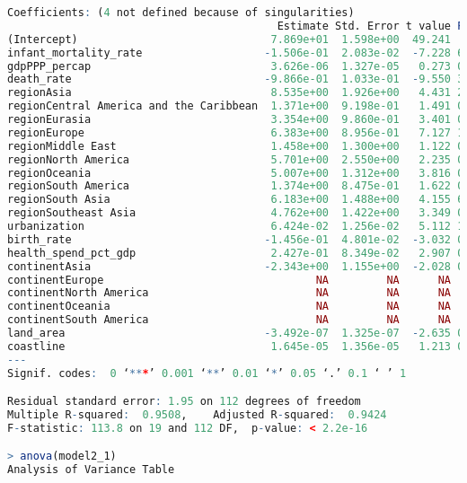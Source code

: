 \begin{lstlisting}[language=R, caption=Result of the model]
Coefficients: (4 not defined because of singularities)
                                          Estimate Std. Error t value Pr(>|t|)    
(Intercept)                              7.869e+01  1.598e+00  49.241  < 2e-16 ***
infant_mortality_rate                   -1.506e-01  2.083e-02  -7.228 6.40e-11 ***
gdpPPP_percap                            3.626e-06  1.327e-05   0.273 0.785155    
death_rate                              -9.866e-01  1.033e-01  -9.550 3.62e-16 ***
regionAsia                               8.535e+00  1.926e+00   4.431 2.19e-05 ***
regionCentral America and the Caribbean  1.371e+00  9.198e-01   1.491 0.138788    
regionEurasia                            3.354e+00  9.860e-01   3.401 0.000930 ***
regionEurope                             6.383e+00  8.956e-01   7.127 1.06e-10 ***
regionMiddle East                        1.458e+00  1.300e+00   1.122 0.264402    
regionNorth America                      5.701e+00  2.550e+00   2.235 0.027378 *  
regionOceania                            5.007e+00  1.312e+00   3.816 0.000223 ***
regionSouth America                      1.374e+00  8.475e-01   1.622 0.107662    
regionSouth Asia                         6.183e+00  1.488e+00   4.155 6.39e-05 ***
regionSoutheast Asia                     4.762e+00  1.422e+00   3.349 0.001105 ** 
urbanization                             6.424e-02  1.256e-02   5.112 1.32e-06 ***
birth_rate                              -1.456e-01  4.801e-02  -3.032 0.003018 ** 
health_spend_pct_gdp                     2.427e-01  8.349e-02   2.907 0.004403 ** 
continentAsia                           -2.343e+00  1.155e+00  -2.028 0.044965 *  
continentEurope                                 NA         NA      NA       NA    
continentNorth America                          NA         NA      NA       NA    
continentOceania                                NA         NA      NA       NA    
continentSouth America                          NA         NA      NA       NA    
land_area                               -3.492e-07  1.325e-07  -2.635 0.009606 ** 
coastline                                1.645e-05  1.356e-05   1.213 0.227708    
---
Signif. codes:  0 ‘***’ 0.001 ‘**’ 0.01 ‘*’ 0.05 ‘.’ 0.1 ‘ ’ 1

Residual standard error: 1.95 on 112 degrees of freedom
Multiple R-squared:  0.9508,	Adjusted R-squared:  0.9424 
F-statistic: 113.8 on 19 and 112 DF,  p-value: < 2.2e-16

> anova(model2_1)
Analysis of Variance Table


\end{lstlisting}
